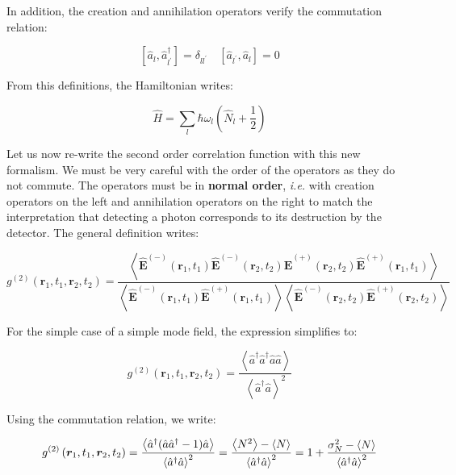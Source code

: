 In addition, the creation and annihilation operators verify the commutation relation:

\begin{equation}
    \left[\hat{a}_{l}, \hat{a}_{l^{\prime}}^{\dagger}\right]=\delta_{l l^{\prime}} \quad\left[\hat{a}_{l^{\prime}}, \hat{a}_{l}\right]=0
\end{equation}

From this definitions, the Hamiltonian writes:

\begin{equation}
    \hat{H}=\sum_{l} \hbar \omega_{l}\left(\hat{N}_{l}+\frac{1}{2}\right)
\end{equation}

 Let us now re-write the second order correlation function with this new formalism. We must be very careful with the order of the operators as they do not commute. The operators must be in \textbf{normal order}, {\it i.e.} with creation operators on the left and annihilation operators on the right to match the interpretation that detecting a photon corresponds to its destruction by the detector. The general definition writes:

\begin{equation}
    g^{(2)}\left(\bm{r}_{1}, t_{1}, \bm{r}_{2}, t_{2}\right)=\frac{\left\langle\hat{\bm{E}}^{(-)}\left(\bm{r}_{1}, t_{1}\right) \hat{\bm{E}}^{(-)}\left(\bm{r}_{2}, t_{2}\right) \hat{\bm{E}}^{(+)}\left(\bm{r}_{2}, t_{2}\right) \hat{\bm{E}}^{(+)}\left(\bm{r}_{1}, t_{1}\right)\right\rangle}{\left\langle\hat{\bm{E}}^{(-)}\left(\bm{r}_{1}, t_{1}\right) \hat{\bm{E}}^{(+)}\left(\bm{r}_{1}, t_{1}\right)\right\rangle\left\langle\hat{\bm{E}}^{(-)}\left(\bm{r}_{2}, t_{2}\right) \hat{\bm{E}}^{(+)}\left(\bm{r}_{2}, t_{2}\right)\right\rangle}
\end{equation}

For the simple case of a simple mode field, the expression simplifies to: 

\begin{equation}
     g^{(2)}\left(\bm{r}_{1}, t_{1}, \bm{r}_{2}, t_{2}\right) = \frac{\left\langle\hat{a}^{\dagger} \hat{a}^{\dagger} \hat{a} \hat{a}\right\rangle} {\left\langle\hat{a}^{\dagger} \hat{a}\right\rangle^{2}}
\end{equation}

Using the commutation relation, we write:

\begin{equation}
    g^{(2)}\left(\bm{r}_{1}, t_{1}, \bm{r}_{2}, t_{2}\right) = \frac{\left\langle\hat{a}^{\dagger} ( \hat{a} \hat{a}^{\dagger}-1) \hat{a} \right\rangle} {\left\langle\hat{a}^{\dagger} \hat{a}\right\rangle^{2}} = \frac{\left\langle N^2\right\rangle-\left\langle N\right\rangle}{\left\langle\hat{a}^{\dagger} \hat{a}\right\rangle^{2}}  = 1 +  \frac{\sigma^2_N-\left\langle N\right\rangle}{\left\langle\hat{a}^{\dagger} \hat{a}\right\rangle^{2}}
\end{equation}

